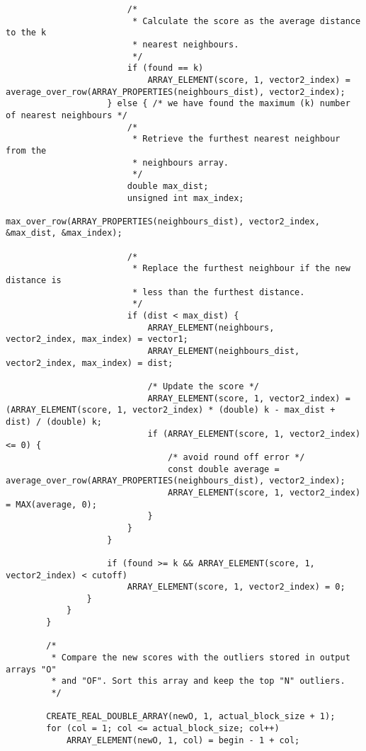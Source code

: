 \begin{lstlisting}
                        /* 
                         * Calculate the score as the average distance to the k 
                         * nearest neighbours.
                         */
                        if (found == k)
                            ARRAY_ELEMENT(score, 1, vector2_index) = average_over_row(ARRAY_PROPERTIES(neighbours_dist), vector2_index);
                    } else { /* we have found the maximum (k) number of nearest neighbours */
                        /* 
                         * Retrieve the furthest nearest neighbour from the 
                         * neighbours array.
                         */
                        double max_dist;
                        unsigned int max_index;
                        max_over_row(ARRAY_PROPERTIES(neighbours_dist), vector2_index, &max_dist, &max_index);

                        /* 
                         * Replace the furthest neighbour if the new distance is
                         * less than the furthest distance.
                         */
                        if (dist < max_dist) {
                            ARRAY_ELEMENT(neighbours,      vector2_index, max_index) = vector1;
                            ARRAY_ELEMENT(neighbours_dist, vector2_index, max_index) = dist;

                            /* Update the score */
                            ARRAY_ELEMENT(score, 1, vector2_index) = (ARRAY_ELEMENT(score, 1, vector2_index) * (double) k - max_dist + dist) / (double) k;
                            if (ARRAY_ELEMENT(score, 1, vector2_index) <= 0) {
                                /* avoid round off error */
                                const double average = average_over_row(ARRAY_PROPERTIES(neighbours_dist), vector2_index);
                                ARRAY_ELEMENT(score, 1, vector2_index) = MAX(average, 0);
                            }
                        }
                    }

                    if (found >= k && ARRAY_ELEMENT(score, 1, vector2_index) < cutoff)
                        ARRAY_ELEMENT(score, 1, vector2_index) = 0;
                }
            }
        }
        
        /*
		 * Compare the new scores with the outliers stored in output arrays "O" 
		 * and "OF". Sort this array and keep the top "N" outliers.
		 */

        CREATE_REAL_DOUBLE_ARRAY(newO, 1, actual_block_size + 1);
        for (col = 1; col <= actual_block_size; col++)
            ARRAY_ELEMENT(newO, 1, col) = begin - 1 + col;
		 

\end{lstlisting}
